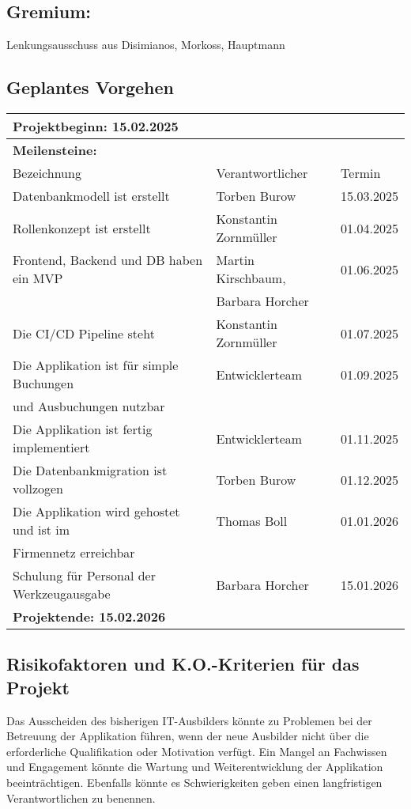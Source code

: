\documentclass[a4paper, 12pt]{article}
\begin{document}
\subsection*{Gremium:} 
Lenkungsausschuss aus Disimianos, Morkoss, Hauptmann

\vspace{1cm}

\subsection{Geplantes Vorgehen}

\setlength{\tabcolsep}{.3cm}
\renewcommand{\arraystretch}{1.5}
\begin{tabular}{|l|l|l|} \hline
\multicolumn{3}{|l|}{\textbf{Projektbeginn: 15.02.2025}} \\ \hline
\multicolumn{3}{|l|}{\textbf{Meilensteine:}} \\ \hline
Bezeichnung & Verantwortlicher & Termin \\ \cline{1-3}
Datenbankmodell ist erstellt & Torben Burow & 15.03.2025 \\ \hline
Rollenkonzept ist erstellt & Konstantin Zornmüller & 01.04.2025 \\ \hline
Frontend, Backend und DB haben ein MVP & Martin Kirschbaum, & 01.06.2025 \\
&  Barbara Horcher & \\ \hline
Die CI/CD Pipeline steht & Konstantin Zornmüller & 01.07.2025 \\ \hline
Die Applikation ist für simple Buchungen & Entwicklerteam & 01.09.2025 \\ 
und Ausbuchungen nutzbar & & \\ \hline
Die Applikation ist fertig implementiert & Entwicklerteam & 01.11.2025 \\ \hline
Die Datenbankmigration ist vollzogen & Torben Burow & 01.12.2025 \\ \hline
Die Applikation wird gehostet und ist im & Thomas Boll & 01.01.2026 \\
Firmennetz erreichbar & & \\ \hline
Schulung für Personal der Werkzeugausgabe & Barbara Horcher & 15.01.2026 \\ \hline
\multicolumn{3}{|l|}{\textbf{Projektende: 15.02.2026}} \\ \hline
\end{tabular}

\vspace{1cm}

\subsection{Risikofaktoren und K.O.-Kriterien für das Projekt}
Das Ausscheiden des bisherigen IT-Ausbilders könnte zu Problemen bei der Betreuung der Applikation führen, wenn der neue Ausbilder nicht über die erforderliche Qualifikation oder Motivation verfügt. Ein Mangel an Fachwissen und Engagement könnte die Wartung und Weiterentwicklung der Applikation beeinträchtigen. Ebenfalls könnte es Schwierigkeiten geben einen langfristigen Verantwortlichen zu benennen.
\end{document}
